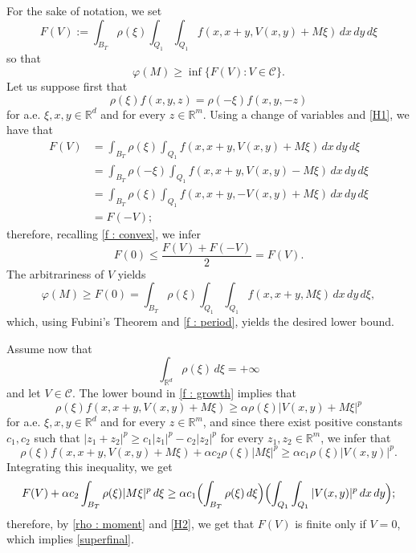 \documentclass{article}
\theoremstyle{definition}
\newcommand{\f}{\varphi}
\newcommand{\R}{\mathbb{R}}
\begin{document}
For the sake of notation, we set
\begin{equation*}
        F(V):=\int_{B_T} \rho(\xi)\int_{Q_1}\int_{Q_1} f(x,x+y,V(x,y)+M\xi)\, dx\,dy\,d\xi  
    \end{equation*}
    so that
    \begin{equation*}
    \f(M) \geq \inf\{ F(V) : V\in\mathcal{C}\}.
\end{equation*}
Let us suppose first that
\begin{equation*}
    \tag{H1}
        \rho(\xi)f(x,y,z)=\rho(-\xi)f(x,y,-z) 
    \end{equation*}
    for a.e. $\xi,x,y\in \R^d$ and for every $z\in\R^m$. Using a change of variables and \eqref{H1}, we have that
    \begin{align*}
        F(V) & =\int_{B_T} \rho(\xi)\int_{Q_1} f(x,x+y,V(x,y)+M\xi)\, dx\,dy\,d\xi \\
        & = \int_{B_T} \rho(-\xi)\int_{Q_1} f(x,x+y,V(x,y)-M\xi)\, dx\,dy\,d\xi \\
        & = \int_{B_T} \rho(\xi)\int_{Q_1} f(x,x+y, -V(x,y)+M\xi)\, dx\,dy\,d\xi \\
        & = F(-V);
    \end{align*}
    therefore, recalling \eqref{f : convex}, we infer
    \begin{equation*}
        F(0)\leq \frac{F(V)+F(-V)}{2} = F(V).
    \end{equation*}
    The arbitrariness of $V$ yields
    \begin{equation}\label{superfinal}
        \f(M)\geq F(0)=\int_{B_T} \rho(\xi)\int_{Q_1}\int_{Q_1} f(x,x+y,M\xi)\, dx\,dy\,d\xi ,
    \end{equation}
    which, using Fubini's Theorem and \eqref{f : period}, yields the desired lower bound.

\smallskip

Assume now that
\begin{equation*}
    \tag{H2}
    \int_{\R^d}\rho(\xi)\,d\xi =+\infty
\end{equation*}
and let $V\in \mathcal{C}$. The lower bound in \eqref{f : growth} implies that
\begin{equation*}
    \rho(\xi)f(x,x+y, V(x,y)+M\xi) \geq \alpha \rho(\xi)|V(x,y)+M\xi|^p
\end{equation*}
for a.e. $\xi,x,y\in \R^d$ and for every $z\in\R^m$,
and since there exist positive constants $c_1,c_2$ such that $|z_1+z_2|^p\geq c_1|z_1|^p-c_2|z_2|^p$ for every $z_1,z_2\in\R^m$, we infer that
\begin{equation*}
    \rho(\xi)f(x,x+y, V(x,y)+M\xi) + \alpha c_2 \rho(\xi)|M\xi|^p \geq \alpha c_1 \rho(\xi)|V(x,y)|^p.
\end{equation*}
Integrating this inequality, we get
\begin{equation*}
 F(V) +\alpha c_2\int_{B_T} \rho(\xi)|M\xi|^p\,d\xi  \geq \alpha c_1\Bigl(\int_{B_T} \rho(\xi)\,d\xi\Bigr)\Bigl(\int_{Q_1}\int_{Q_1} |V(x,y)|^p\, dx\,dy\Bigr);
\end{equation*}
therefore, by \eqref{rho : moment} and \eqref{H2}, we get that $F(V)$ is finite only if $V=0$, which implies \eqref{superfinal}.
\end{document}
